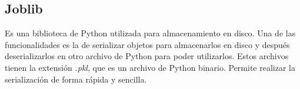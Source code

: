 \subsection{Joblib}
Es una biblioteca de Python utilizada para almacenamiento en disco. Una de las funcionalidades es la de serializar objetos para almacenarlos en disco y después deserializarlos en otro archivo de Python para poder utilizarlos. Estos archivos tienen la extensión \textit{.pkl}, que es un archivo de Python binario. Permite realizar la serialización de forma rápida y sencilla.
